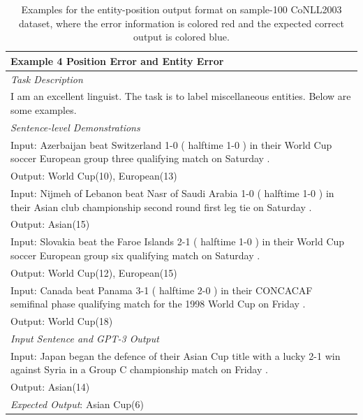 \documentclass[11pt]{article}
\begin{document}
\begin{table}[th!]
{\begin{tabular}{l}
\textbf{Example 4 {\color{red} Position Error and Entity Error}} \\\midrule
       	\textit{Task Description} \\
I am an excellent linguist. The task is to label miscellaneous entities. Below are some examples. \\
\textit{Sentence-level Demonstrations} \\
Input: Azerbaijan beat Switzerland 1-0 ( halftime 1-0 ) in their World Cup soccer European group three qualifying match on Saturday . \\
Output: World Cup(10), European(13) \\
Input: Nijmeh of Lebanon beat Nasr of Saudi Arabia 1-0 ( halftime 1-0 ) in their Asian club championship second round first leg tie on Saturday . \\
Output: Asian(15) \\
Input: Slovakia beat the Faroe Islands 2-1 ( halftime 1-0 ) in their World Cup soccer European group six qualifying match on Saturday . \\
Output: World Cup(12), European(15) \\
Input: Canada beat Panama 3-1 ( halftime 2-0 ) in their CONCACAF semifinal phase qualifying match for the 1998 World Cup on Friday . \\
Output: World Cup(18) \\\midrule
\textit{Input Sentence and GPT-3 Output} \\
Input: Japan began the defence of their Asian Cup title with a lucky 2-1 win against Syria in a Group C championship match on Friday . \\
Output: Asian(14) \\
{\color{blue}\it Expected Output}: Asian Cup(6) \\\bottomrule
    \end{tabular}
    }
     \caption{Examples for the entity-position output format on sample-100 CoNLL2003 dataset, where the error information is colored red and the expected correct output is colored blue.}
    \label{tab:entity_position_format}
\end{table}
\end{document}
